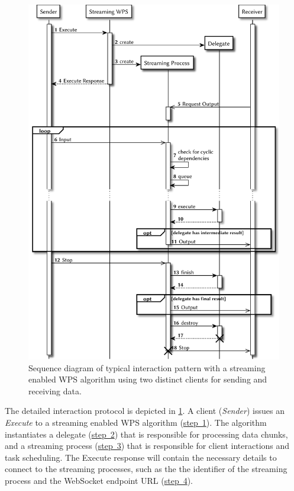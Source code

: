     \begin{figure}[!htb]
      \centering
      \includegraphics[width = 0.82253521126760565\linewidth]{figures/sequence-diagram-swps.pdf}
      \caption{\label{fig:sd:swps}Sequence diagram of typical interaction pattern with a streaming enabled WPS algorithm using two distinct clients for sending and receiving data.}
    \end{figure}

    The detailed interaction protocol is depicted in \cref{fig:sd:swps}. A client (\emph{Sender}) issues an \emph{Execute} to a streaming enabled WPS algorithm (\hyperref[fig:sd:swps]{step~1}). The algorithm instantiates a delegate (\hyperref[fig:sd:swps]{step~2}) that is responsible for processing data chunks, and a streaming process (\hyperref[fig:sd:swps]{step~3}) that is responsible for client interactions and task scheduling. The Execute response will contain the necessary details to connect to the streaming processes, such as the the identifier of the streaming process and the WebSocket endpoint URL (\hyperref[fig:sd:swps]{step~4}).

